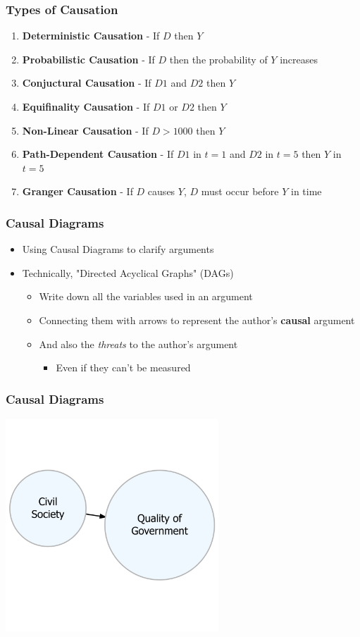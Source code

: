 \documentclass[xcolor=x11names,compress]{beamer}\usepackage[]{graphicx}\usepackage[]{xcolor}
\renewcommand{\(}{\begin{columns}}
\renewcommand{\)}{\end{columns}}
\newcommand{\<}[1]{\begin{column}{#1}}
\renewcommand{\>}{\end{column}}
\begin{document}
\begin{frame}
\frametitle{Types of Causation}
\begin{enumerate}
\item \textbf{Deterministic Causation} - If $D$ then $Y$
\pause
\item \textbf{Probabilistic Causation} - If $D$ then the probability of $Y$ increases
\pause
\item \textbf{Conjuctural Causation} - If $D1$ and $D2$ then $Y$
\pause
\item \textbf{Equifinality Causation} - If $D1$ or $D2$ then $Y$
\pause
\item \textbf{Non-Linear Causation} - If $D>1000$ then $Y$
\pause
\item \textbf{Path-Dependent Causation} - If $D1$ in $t=1$ and $D2$ in $t=5$ then $Y$ in $t=5$
\pause
\item \textbf{Granger Causation} - If $D$ causes $Y$, $D$ must occur before $Y$ in time 
\end{enumerate}
\end{frame}

\begin{frame}
\frametitle{Causal Diagrams}
\begin{itemize}
\item Using Causal Diagrams to clarify arguments
\pause
\item Technically, "Directed Acyclical Graphs" (DAGs)
\pause
\begin{itemize}
\item Write down all the variables used in an argument
\pause
\item Connecting them with arrows to represent the author's \textbf{causal} argument
\pause
\item And also the \textit{threats} to the author's argument
\begin{itemize}
\item Even if they can't be measured
\end{itemize}
\end{itemize}
\end{itemize}
\end{frame}

\begin{frame}
\frametitle{Causal Diagrams}

\includegraphics[width=0.6\textwidth]{graph1.png}
\end{frame}
\end{document}
